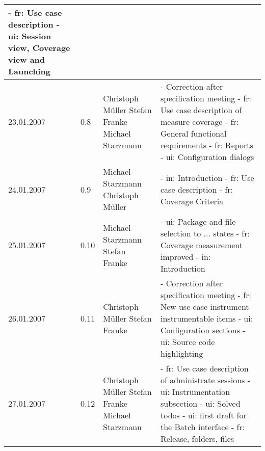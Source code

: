 {\begin{longtable}{|l|l|p{35mm}|p{71mm}|}
      - fr: Use case description \newline
      - ui: Session view, Coverage view and Launching \\\hline
    23.01.2007 & 0.8 & Christoph Müller \newline Stefan Franke \newline Michael Starzmann& 
      - Correction after specification meeting \newline
      - fr: Use case description of measure coverage \newline
      - fr: General functional requirements \newline
      - fr: Reports \newline
      - ui: Configuration dialogs \\\hline
    24.01.2007 & 0.9 & Michael Starzmann \newline Christoph Müller & 
      - in: Introduction \newline
      - fr: Use case description \newline
      - fr: Coverage Criteria \\\hline
    25.01.2007 & 0.10 & Michael Starzmann \newline Stefan Franke & 
      - ui: Package and file selection to ... states \newline
      - fr: Coverage measurement improved \newline
      - in: Introduction \\\hline
    26.01.2007 & 0.11 & Christoph Müller \newline Stefan Franke & 
      - Correction after specification meeting \newline
      - fr: New use case instrument instrumentable items \newline
      - ui: Configuration sections \newline
      - ui: Source code highlighting \\\hline
    27.01.2007 & 0.12 & Christoph Müller \newline Stefan Franke \newline Michael Starzmann & 
      - fr: Use case description of administrate sessions \newline
      - ui: Instrumentation subsection \newline
      - ui: Solved todos \newline
      - ui: first draft for the Batch interface \newline
      - fr: Release, folders, files \\\hline

\end{longtable}}
